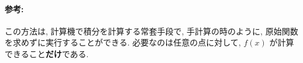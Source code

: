\documentclass[10pt,dvipdfmx]{article}
\begin{document}
\paragraph{参考:} この方法は, 計算機で積分を計算する常套手段で, 
手計算の時のように,
原始関数を求めずに実行することができる. 
必要なのは任意の点に対して, $f(x)$
が計算できること{\bf だけ}である.

\end{document}
